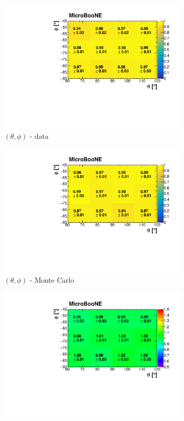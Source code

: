 \documentclass[a4paper,11pt]{article}
\begin{document}
\begin{figure}[htbp]
  \begin{subfigure}{0.32\textwidth}
    \includegraphics[width=\linewidth]{figures/e_theta_phi.pdf}
    \caption{$(\theta,\phi)$ - data}
  \end{subfigure}\begin{subfigure}{0.32\textwidth}
  \includegraphics[width=\linewidth]{figures/theta_phi_mc.pdf}
  \caption{$(\theta,\phi)$ - Monte Carlo}
\end{subfigure}\begin{subfigure}{0.32\textwidth}
  \includegraphics[width=\linewidth]{figures/theta_phi2.pdf}

\end{subfigure}
\end{figure}
\end{document}
